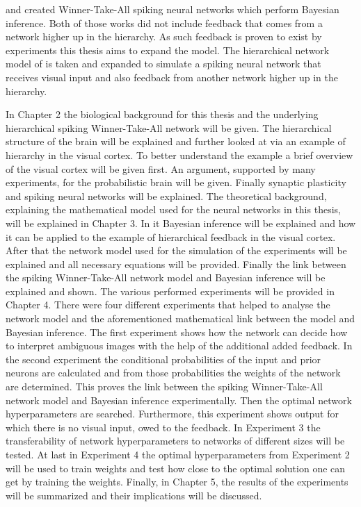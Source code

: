 \citet{nessler} and \citet{nesslerClone} created Winner-Take-All spiking neural networks which perform Bayesian inference. Both of those works did not include feedback that comes from a network higher up in the hierarchy. As such feedback is proven to exist by experiments this thesis aims to expand the model. The hierarchical network model of \citet{nessler} is taken and expanded to simulate a spiking neural network that receives visual input and also feedback from another network higher up in the hierarchy.

In Chapter 2 the biological background for this thesis and the underlying hierarchical spiking Winner-Take-All network will be given. The hierarchical structure of the brain will be explained and further looked at via an example of hierarchy in the visual cortex. To better understand the example a brief overview of the visual cortex will be given first. An argument, supported by many experiments, for the probabilistic brain will be given. Finally synaptic plasticity and spiking neural networks will be explained.
The theoretical background, explaining the mathematical model used for the neural networks in this thesis, will be explained in Chapter 3. In it Bayesian inference will be explained and how it can be applied to the example of hierarchical feedback in the visual cortex. After that the network model used for the simulation of the experiments will be explained and all necessary equations will be provided. Finally the link between the spiking Winner-Take-All network model and Bayesian inference will be explained and shown.
The various performed experiments will be provided in Chapter 4. There were four different experiments that helped to analyse the network model and the aforementioned mathematical link between the model and Bayesian inference. The first experiment shows how the network can decide how to interpret ambiguous images with the help of the additional added feedback. In the second experiment the conditional probabilities of the input and prior neurons are calculated and from those probabilities the weights of the network are determined. This proves the link between the spiking Winner-Take-All network model and Bayesian inference experimentally. Then the optimal network hyperparameters are searched. Furthermore, this experiment shows output for which there is no visual input, owed to the feedback. In Experiment 3 the transferability of network hyperparameters to networks of different sizes will be tested. At last in Experiment 4 the optimal hyperparameters from Experiment 2 will be used to train weights and test how close to the optimal solution one can get by training the weights.
Finally, in Chapter 5, the results of the experiments will be summarized and their implications will be discussed.